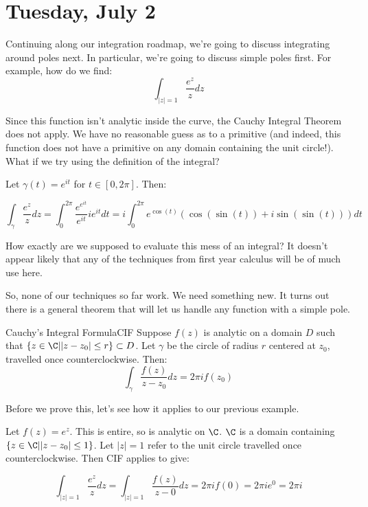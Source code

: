\section{Tuesday, July 2}


Continuing along our integration roadmap, we're going to discuss integrating around poles next. In particular, we're going to discuss simple poles first. For example, how do we find:
$$\int_{|z| = 1} \frac{e^z}{z}dz$$

Since this function isn't analytic inside the curve, the Cauchy Integral Theorem does not apply. We have no reasonable guess as to a primitive (and indeed, this function does not have a primitive on any domain containing the unit circle!). What if we try using the definition of the integral?

\begin{ex}{}{} Let $\gamma(t) = e^{it}$ for $t\in [0,2\pi]$. Then:

$$\int_{\gamma} \frac{e^z}{z}dz = \int_0^{2\pi} \frac{e^{e^{it}}}{e^{it}}ie^{it}dt = i\int_0^{2\pi} e^{\cos(t)}(\cos(\sin(t)) + i\sin(\sin(t)))dt$$

How exactly are we supposed to evaluate this mess of an integral? It doesn't appear likely that any of the techniques from first year calculus will be of much use here.\end{ex}

So, none of our techniques so far work. We need something new. It turns out there is a general theorem that will let us handle any function with a simple pole.

\begin{thmbo}{Cauchy's Integral Formula}{CIF}
Suppose $f(z)$ is analytic on a domain $D$ such that $\{z\in\C||z-z_0|\le r\} \subset D$. Let $\gamma$ be the circle of radius $r$ centered at $z_0$, travelled once counterclockwise. Then:
$$\int_{\gamma} \frac{f(z)}{z - z_0}dz = 2\pi i f(z_0)$$
\end{thmbo}

Before we prove this, let's see how it applies to our previous example.

\begin{ex}{}{} Let $f(z) = e^z$. This is entire, so is analytic on $\C$. $\C$ is a domain containing $\{z\in\C||z-z_0|\le 1\}$. Let $|z| = 1$ refer to the unit circle travelled once counterclockwise. Then CIF applies to give:

$$\int_{|z| = 1}\frac{e^z}{z}dz = \int_{|z| = 1} \frac{f(z)}{z-0}dz = 2\pi i f(0) = 2\pi i e^0 = 2\pi i$$
\end{ex}

